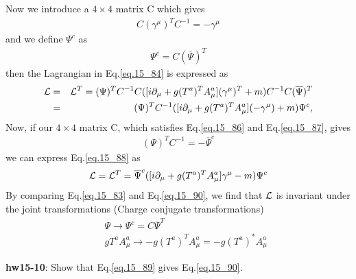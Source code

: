 \documentclass[12pt]{article}
\def\del{{\partial}}
\begin{document}
{  Now we introduce a $4\times 4$ matrix C which gives
\begin{eqnarray}
  C (\gamma^\mu)^T C^{-1} = -\gamma^\mu \label{eq.15_86}
\end{eqnarray}
  and we define $\Psi^c$ as
\begin{eqnarray}
  \Psi^c = C ({\overline \Psi})^T \label{eq.15_87}
\end{eqnarray}
 then the Lagrangian in Eq.\ref{eq.15_84} is expressed as
\begin{eqnarray}
  {\cal L} &=& {\cal L}^T
  = (\Psi)^T C^{-1} C
  ([i\del_\mu +g(T^a)^TA^a_\mu](\gamma^\mu)^T +m) C^{-1} C ({\overline \Psi})^T \\
  &=& (\Psi)^T C^{-1} ([i\del_\mu +g(T^a)^TA^a_\mu](-\gamma^\mu) +m)\Psi^c, \label{eq.15_88}
\end{eqnarray}
  Now, if our $4 \times 4$ matrix C, which satisfies Eq.\ref{eq.15_86} and Eq.\ref{eq.15_87}, gives
\begin{eqnarray}
  (\Psi)^T C^{-1} = -\overline{\Psi}^c \label{eq.15_89}
\end{eqnarray}
  we can express Eq.\ref{eq.15_88} as
\begin{eqnarray}
  {\cal L} = {\cal L}^T
  = \overline{\Psi}^c ([i\del_\mu +g(T^a)^TA^a_\mu] \gamma^\mu -m)\Psi^c \label{eq.15_90}
\end{eqnarray}
  By comparing Eq.\ref{eq.15_83} and Eq.\ref{eq.15_90}, we find that ${\cal L}$ is invariant under the joint transformations (Charge conjugate transformations)
\begin{eqnarray}
  && \Psi  \to \Psi^c = C {\overline \Psi}^T \label{eq.15_91a}\\
  && g T^a A^a_\mu \to -g (T^a)^T A^a_\mu = -g (T^a)^* A^a_\mu\label{eq.15_91b}
\end{eqnarray}
  
{\bf hw15-10}: Show that Eq.\ref{eq.15_89} gives Eq.\ref{eq.15_90}.

}
\end{document}
